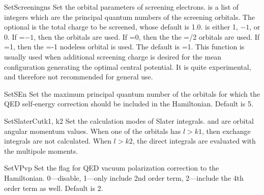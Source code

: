 \begin{fundesc}{SetScreening}{ns}
Set the orbital parameters of screening electrons.  is a list of
integers which are the principal quantum numbers of the screening
orbitals. The optional  is the total charge to be screened, whose
default is 1.0.  is either 1, $-1$, or 0. If =$-1$, then
the  orbitals are used. If =0, then the the =/2
orbitals are used. If =1, then the =-1 nodeless orbital
is used. The default is =1. This function is usually used when
additional screening charge is desired for the mean configuration generating
the optimal central potential. It is quite experimental, and therefore not
recommended for general use.
\end{fundesc}

\begin{fundesc}{SetSE}{n}
Set the maximum principal quantum number of the orbitals for which the QED
self-energy correction should be included in the Hamiltonian. Default is 5.
\end{fundesc}

\begin{fundesc}{SetSlaterCut}{k1, k2}
Set the calculation modes of Slater integrals.  and  are orbital
angular momentum values. When one of the orbitals has $l > k1$, then exchange
integrals are not calculated. When $l > k2$, the direct integrals are evaluated
with the multipole moments.
\end{fundesc}

\begin{fundesc}{SetVP}{vp}
Set the flag for QED vacuum polarization correction to the Hamiltonian.
0---disable, 1---only include 2nd order term, 2---include the 4th order term as
well. Default is 2.
\end{fundesc}

